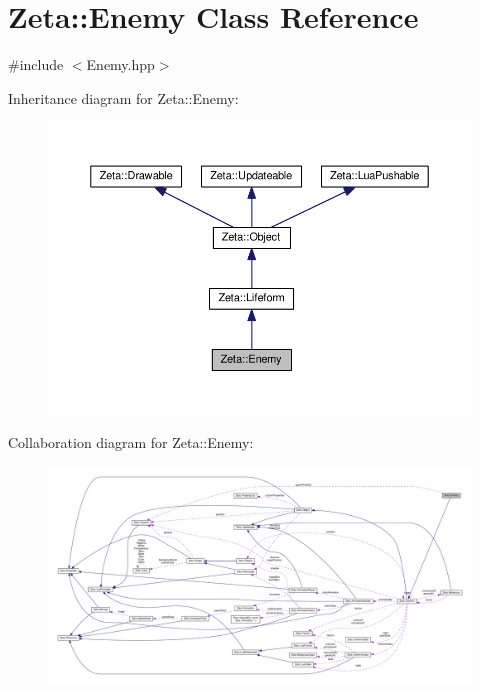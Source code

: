 \hypertarget{classZeta_1_1Enemy}{\section{Zeta\+:\+:Enemy Class Reference}
\label{classZeta_1_1Enemy}
}


{\ttfamily \#include $<$Enemy.\+hpp$>$}



Inheritance diagram for Zeta\+:\+:Enemy\+:\nopagebreak
\begin{figure}[H]
\begin{center}
\leavevmode
\includegraphics[width=350pt]{classZeta_1_1Enemy__inherit__graph}
\end{center}
\end{figure}


Collaboration diagram for Zeta\+:\+:Enemy\+:
\nopagebreak
\begin{figure}[H]
\begin{center}
\leavevmode
\includegraphics[width=350pt]{classZeta_1_1Enemy__coll__graph}
\end{center}
\end{figure}

